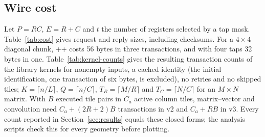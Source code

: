 \subsection{Wire cost}
\label{sec:cost}

Let $P=RC$, $E=R+C$ and $t$ the number of registers selected by a tap mask.
Table~\ref{tab:cost} gives request and reply sizes, including checksums. For
a $4\times4$ diagonal chunk, ++ costs 56 bytes in
three transactions, and  with four taps 32 bytes in one.
Table~\ref{tab:kernel-counts} gives the resulting transaction counts of the
library kernels for nonempty inputs, a cached identity (the initial
identification, one transaction of six bytes, is excluded), no retries and
no skipped tiles; $K=\lceil n/L\rceil$, $Q=\lceil n/C\rceil$,
$T_R=\lceil M/R\rceil$ and $T_C=\lceil N/C\rceil$ for an $M\times N$ matrix.
With $B$ executed tile pairs in $C_a$ active column tiles, matrix--vector
and convolution need $C_a+(2R+2)B$ transactions in v2 and $C_a+RB$ in v3.
Every count reported in Section~\ref{sec:results} equals these closed forms;
the analysis scripts check this for every geometry before plotting.




